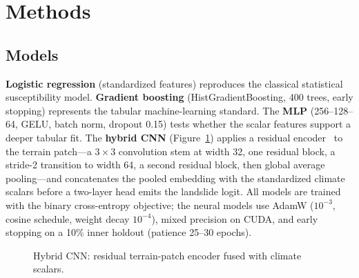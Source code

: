 \documentclass[11pt,a4paper]{article}
\begin{document}
\section{Methods}
\label{sec:methods}

\subsection{Models}
\textbf{Logistic regression} (standardized features) reproduces the classical
statistical susceptibility model. \textbf{Gradient boosting}
(HistGradientBoosting, 400 trees, early stopping) represents the tabular
machine-learning standard. The \textbf{MLP} (256--128--64, GELU, batch norm,
dropout 0.15) tests whether the scalar features support a deeper tabular fit.
The \textbf{hybrid CNN} (Figure~\ref{fig:arch}) applies a residual
encoder~\cite{he2016} to the terrain patch---a $3\times3$ convolution stem at
width 32, one residual block, a stride-2 transition to width 64, a second
residual block, then global average pooling---and concatenates the pooled
embedding with the standardized climate scalars before a two-layer head emits
the landslide logit. All models are trained with the binary cross-entropy
objective; the neural models use AdamW ($10^{-3}$, cosine schedule, weight
decay $10^{-4}$), mixed precision on CUDA, and early stopping on a 10\% inner
holdout (patience 25--30 epochs).

\begin{figure}[htbp]
\centering
{}
\caption{Hybrid CNN: residual terrain-patch encoder fused with climate scalars.}
\label{fig:arch}
\end{figure}
\end{document}
